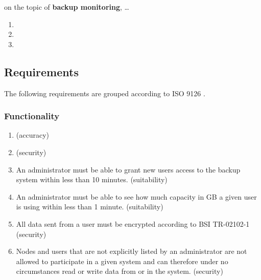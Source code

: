 \begin{flushright}
on the topic of \textbf{backup monitoring}, \ldots{}
\end{flushright}

\begin{enumerate}
	\enumcountrestore
	\item {}
	\item {}
	\item {}
\end{enumerate}


\subsection{Requirements}

The following requirements are grouped according to ISO 9126 \cite{ISO9126}.

\subsubsection{Functionality}

\begin{enumerate}
	\item {} (accuracy)
	\item {} (security)
	\item An administrator must be able to grant new users access to the backup system within less than 10 minutes. (suitability)
	\item An administrator must be able to see how much capacity in GB a given user is using within less than 1 minute. (suitability)
	\item All data sent from a user must be encrypted according to BSI TR-02102-1 \cite{bsi-tr-02102-1} (security)
	\item Nodes and users that are not explicitly listed by an administrator are not allowed to participate in a given system and can therefore under no circumstances read or write data from or in the system. (security)
	\enumcountsave
\end{enumerate}

